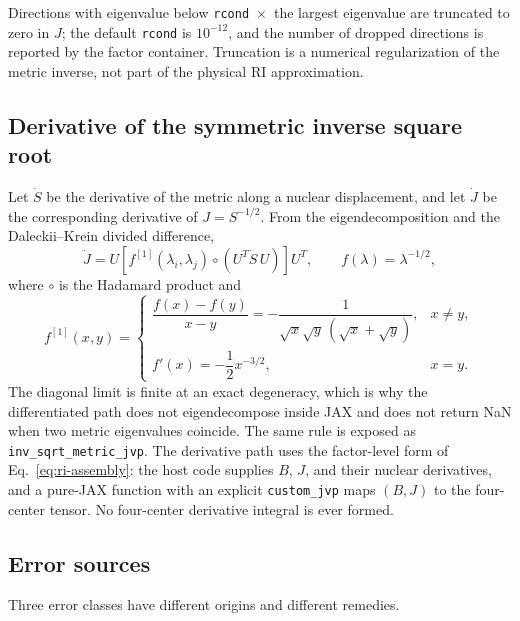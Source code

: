 Directions with eigenvalue below \texttt{rcond}~$\times$~the largest
eigenvalue are truncated to zero in $J$; the default \texttt{rcond} is
$10^{-12}$, and the number of dropped directions is reported by the
factor container.  Truncation is a numerical regularization of the
metric inverse, not part of the physical RI approximation.

\subsection{Derivative of the symmetric inverse square root}

Let $\dot S$ be the derivative of the metric along a nuclear
displacement, and let $\dot J$ be the corresponding derivative of
$J=S^{-1/2}$.  From the eigendecomposition and the Daleckii--Krein
divided difference,
\begin{equation}
  \dot J
  = U\left[
      f^{[1]}(\lambda_i,\lambda_j)\circ
      \left(U^{T}\dot S\,U\right)
    \right]U^{T},
  \qquad
  f(\lambda)=\lambda^{-1/2},
  \label{eq:ri-dj}
\end{equation}
where $\circ$ is the Hadamard product and
\begin{equation}
  f^{[1]}(x,y)=
  \begin{cases}
    \dfrac{f(x)-f(y)}{x-y}
      = -\dfrac{1}{\sqrt{x}\sqrt{y}\,(\sqrt{x}+\sqrt{y})},
      & x\neq y,\\[2mm]
    f'(x)=-\dfrac{1}{2}x^{-3/2}, & x=y.
  \end{cases}
  \label{eq:ri-divided}
\end{equation}
The diagonal limit is finite at an exact degeneracy, which is why the
differentiated path does not eigendecompose inside JAX and does not
return NaN when two metric eigenvalues coincide.  The same rule is
exposed as \texttt{inv\_sqrt\_metric\_jvp}.  The derivative path uses
the factor-level form of Eq.~\eqref{eq:ri-assembly}: the host code
supplies $B$, $J$, and their nuclear derivatives, and a pure-JAX
function with an explicit \texttt{custom\_jvp} maps $(B,J)$ to the
four-center tensor.  No four-center derivative integral is ever formed.

\subsection{Error sources}

Three error classes have different origins and different remedies.

